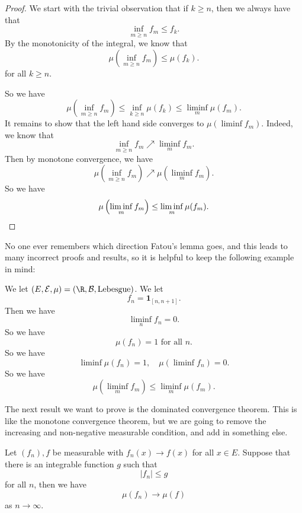 \documentclass[a4paper]{article}
\begin{document}
\begin{proof}
  We start with the trivial observation that if $k\geq n$, then we always have that
  \[
    \inf_{m \geq n} f_m \leq f_k.
  \]
  By the monotonicity of the integral, we know that
  \[
    \mu\left(\inf_{m \geq n} f_m\right) \leq \mu(f_k).
  \]
  for all $k \geq n$.

  So we have
  \[
    \mu\left(\inf_{m \geq n} f_m\right) \leq \inf_{k \geq n} \mu(f_k) \leq \liminf_m \mu(f_m).
  \]
  It remains to show that the left hand side converges to $\mu(\liminf f_m)$. Indeed, we know that
  \[
    \inf_{m \geq n} f_m \nearrow \liminf_m f_m.
  \]
  Then by monotone convergence, we have
  \[
    \mu\left(\inf_{m \geq n} f_m\right) \nearrow \mu\left(\liminf_m f_m\right).
  \]
  So we have
  \[
    \mu\left(\liminf_m f_m\right) \leq \liminf_m \mu(f_m).\qedhere
  \]
\end{proof}
No one ever remembers which direction Fatou's lemma goes, and this leads to many incorrect proofs and results, so it is helpful to keep the following example in mind:

\begin{eg}
  We let $(E, \mathcal{E}, \mu) = (\R, \mathcal{B}, \text{Lebesgue})$. We let
  \[
    f_n = \mathbf{1}_{[n, n + 1]}.
  \]
  Then we have
  \[
    \liminf_n f_n = 0.
  \]
  So we have
  \[
    \mu(f_n) = 1\text{ for all }n.
  \]
  So we have
  \[
    \liminf \mu(f_n) = 1,\quad \mu(\liminf f_n) = 0.
  \]
  So we have
  \[
    \mu\left(\liminf_m f_m\right) \leq \liminf_m \mu(f_m).
  \]
\end{eg}
The next result we want to prove is the dominated convergence theorem. This is like the monotone convergence theorem, but we are going to remove the increasing and non-negative measurable condition, and add in something else.
\begin{thm}
  Let $(f_n), f$ be measurable with $f_n(x) \to f(x)$ for all $x \in E$. Suppose that there is an integrable function $g$ such that
  \[
    |f_n| \leq g
  \]
  for all $n$, then we have
  \[
    \mu(f_n) \to \mu(f)
  \]
  as $n \to \infty$.
\end{thm}
\end{document}
